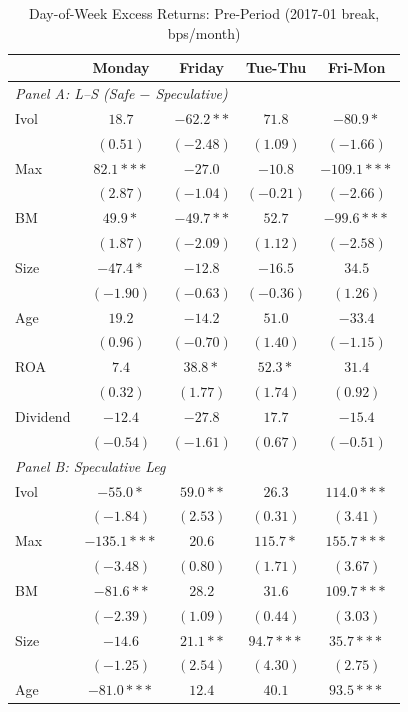 \begin{table}[htbp]
\centering
\caption{Day-of-Week Excess Returns: Pre-Period (2017-01 break, bps/month)}
\label{tab:split_201701_pre}
\footnotesize
\begin{tabular}{l c c c c}
\toprule
 & Monday & Friday & Tue-Thu & Fri-Mon \\
\midrule
\multicolumn{5}{l}{\textit{Panel A: L--S (Safe $-$ Speculative)}} \\
Ivol & $18.7$ & $-62.2**$ & $71.8$ & $-80.9*$ \\
 & $(0.51)$ & $(-2.48)$ & $(1.09)$ & $(-1.66)$ \\
Max & $82.1***$ & $-27.0$ & $-10.8$ & $-109.1***$ \\
 & $(2.87)$ & $(-1.04)$ & $(-0.21)$ & $(-2.66)$ \\
BM & $49.9*$ & $-49.7**$ & $52.7$ & $-99.6***$ \\
 & $(1.87)$ & $(-2.09)$ & $(1.12)$ & $(-2.58)$ \\
Size & $-47.4*$ & $-12.8$ & $-16.5$ & $34.5$ \\
 & $(-1.90)$ & $(-0.63)$ & $(-0.36)$ & $(1.26)$ \\
Age & $19.2$ & $-14.2$ & $51.0$ & $-33.4$ \\
 & $(0.96)$ & $(-0.70)$ & $(1.40)$ & $(-1.15)$ \\
ROA & $7.4$ & $38.8*$ & $52.3*$ & $31.4$ \\
 & $(0.32)$ & $(1.77)$ & $(1.74)$ & $(0.92)$ \\
Dividend & $-12.4$ & $-27.8$ & $17.7$ & $-15.4$ \\
 & $(-0.54)$ & $(-1.61)$ & $(0.67)$ & $(-0.51)$ \\
\midrule
\multicolumn{5}{l}{\textit{Panel B: Speculative Leg}} \\
Ivol & $-55.0*$ & $59.0**$ & $26.3$ & $114.0***$ \\
 & $(-1.84)$ & $(2.53)$ & $(0.31)$ & $(3.41)$ \\
Max & $-135.1***$ & $20.6$ & $115.7*$ & $155.7***$ \\
 & $(-3.48)$ & $(0.80)$ & $(1.71)$ & $(3.67)$ \\
BM & $-81.6**$ & $28.2$ & $31.6$ & $109.7***$ \\
 & $(-2.39)$ & $(1.09)$ & $(0.44)$ & $(3.03)$ \\
Size & $-14.6$ & $21.1**$ & $94.7***$ & $35.7***$ \\
 & $(-1.25)$ & $(2.54)$ & $(4.30)$ & $(2.75)$ \\
Age & $-81.0***$ & $12.4$ & $40.1$ & $93.5***$ \\

\end{tabular}
\end{table}
